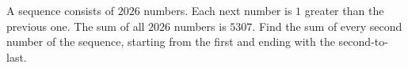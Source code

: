 A sequence consists of $2026$ numbers. Each next number is $1$ greater than the previous one. The sum of all $2026$ numbers is $5307$. Find the sum of every second number of the sequence, starting from the first and ending with the second-to-last.
